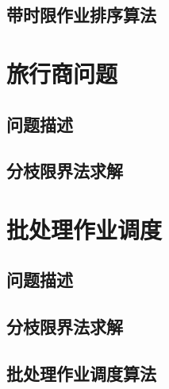 \subsection*{带时限作业排序算法}
\section{旅行商问题}
\subsection*{问题描述}
\subsection*{分枝限界法求解}
\section{批处理作业调度}
\subsection*{问题描述}
\subsection*{分枝限界法求解}
\subsection*{批处理作业调度算法}
